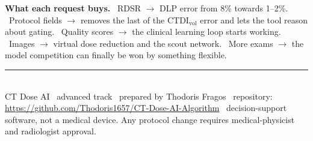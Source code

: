 \documentclass[10pt,a4paper]{article}
\newcommand{\ctdi}{\ensuremath{\mathrm{CTDI}_{\mathrm{vol}}}}
\begin{document}
\begin{safebox}
\textbf{What each request buys.} \ RDSR $\rightarrow$ DLP error from 8\% towards 1--2\%. \
Protocol fields $\rightarrow$ removes the last of the \ctdi{} error and lets the tool reason about gating. \
Quality scores $\rightarrow$ the clinical learning loop starts working. \
Images $\rightarrow$ virtual dose reduction and the scout network. \
More exams $\rightarrow$ the model competition can finally be won by something flexible.
\end{safebox}

\vfill
{\footnotesize\color{ctink2}\rule{\linewidth}{0.4pt}\\[2pt]
CT Dose AI \textperiodcentered\ advanced track \textperiodcentered\ prepared by Thodoris Fragos \textperiodcentered\
repository: \url{https://github.com/Thodoris1657/CT-Dose-AI-Algorithm} \textperiodcentered\ decision-support
software, not a medical device. Any protocol change requires medical-physicist and radiologist approval.\par}
\end{document}
